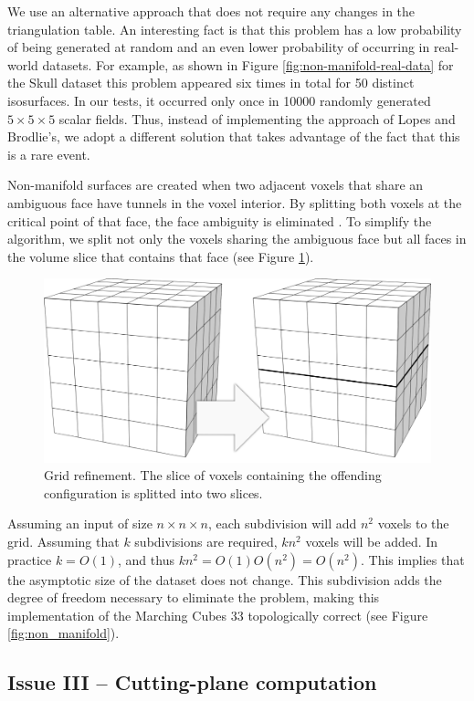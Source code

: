 We use an alternative approach that does not require any changes in the \mc{} triangulation table. An interesting fact is that this problem has a low probability of being generated at random and an even lower probability of occurring in real-world datasets. For example, as shown in Figure \ref{fig:non-manifold-real-data} for the Skull dataset this problem appeared six times in total for 50 distinct isosurfaces. In our tests, it occurred only once in 10000 randomly generated $5\times5\times5$ scalar fields. Thus, instead of implementing the approach of Lopes and Brodlie's, we adopt a different solution that takes advantage of the fact that this is a rare event.

Non-manifold surfaces are created when two adjacent voxels that share an ambiguous face have tunnels in the voxel interior. By splitting both voxels at the critical point of that face, the face ambiguity is  eliminated \cite{10.1109/TVCG.2009.10}.
To simplify the algorithm, we split not only the voxels sharing the ambiguous face but all faces in the volume slice that contains that face (see Figure \ref{fig:grid-refinement}). 
%
\begin{figure}[b]
     \centering
	\includegraphics[width=0.5\linewidth]{chapter4/figures/grid.png}
	\caption{\label{fig:grid-refinement}Grid refinement. The slice of voxels containing the offending configuration is splitted into two slices.}
\end{figure}
%
Assuming an input of size $n \times n \times n$, each subdivision will add $n^2$ voxels to the grid.  Assuming that $k$ subdivisions are required, $k n^2$ voxels will be added. In practice $k = O(1)$, and thus $k n^2 = O(1 )O(n^2) = O(n^2)$. This implies that the asymptotic size of the dataset does not change. This subdivision adds the degree of freedom necessary to eliminate the problem, making this implementation of the Marching Cubes 33 topologically correct (see Figure \ref{fig:non_manifold}). 

\subsection{Issue III -- Cutting-plane computation}

